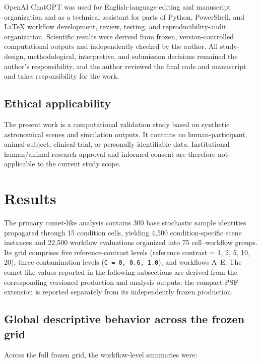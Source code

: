 OpenAI ChatGPT was used for English-language editing and manuscript organization and as a technical assistant for parts of Python, PowerShell, and LaTeX workflow development, review, testing, and reproducibility-audit organization. Scientific results were derived from frozen, version-controlled computational outputs and independently checked by the author. All study-design, methodological, interpretive, and submission decisions remained the author's responsibility, and the author reviewed the final code and manuscript and takes responsibility for the work.

\subsection{Ethical applicability}\label{ethical-applicability}

The present work is a computational validation study based on synthetic
astronomical scenes and simulation outputs. It contains no human-participant,
animal-subject, clinical-trial, or personally identifiable data. Institutional
human/animal research approval and informed consent are therefore not
applicable to the current study scope.

\section{Results}\label{results}

The primary comet-like analysis contains 300 base stochastic sample
identities propagated through 15 condition cells, yielding 4,500
condition-specific scene instances and 22,500 workflow evaluations
organized into 75 cell--workflow groups. Its grid comprises five
reference-contrast levels
(reference contrast = 1, 2, 5, 10, 20), three contamination
levels (\texttt{C\ =\ 0,\ 0.6,\ 1.0}), and workflows A--E. The
comet-like values reported in the following subsections are derived from
the corresponding versioned production and analysis outputs; the
compact-PSF extension is reported separately from its independently
frozen production.

\subsection{Global descriptive behavior across the frozen
grid}\label{global-descriptive-behavior-across-the-frozen-grid}

Across the full frozen grid, the workflow-level summaries were:

